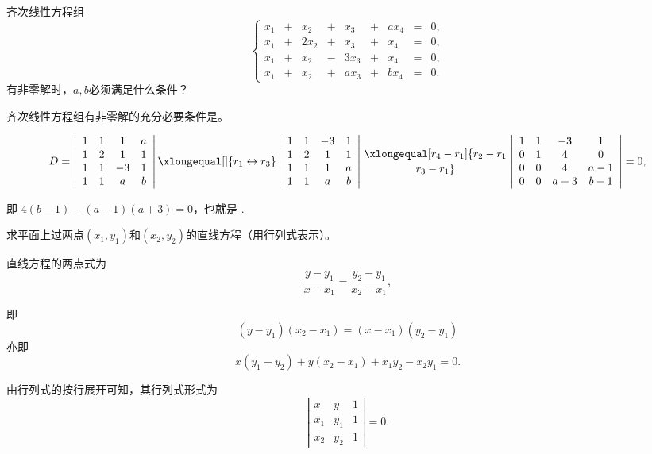 \begin{li}
  齐次线性方程组
  $$
  \left\{
    \begin{array}{rcrcrcrcrc}
      x_1&+& x_2&+& x_3&+&ax_4&=&0,\\[0.1cm]
      x_1&+&2x_2&+& x_3&+& x_4&=&0,\\[0.1cm]
      x_1&+& x_2&-&3x_3&+& x_4&=&0,\\[0.1cm]
      x_1&+& x_2&+&ax_3&+&bx_4&=&0.
    \end{array}
  \right.
  $$
  有非零解时，$a,b$必须满足什么条件？
\end{li}

\begin{zhu}
  齐次线性方程组有非零解的充分必要条件是。
\end{zhu}

\begin{jie}
$$
D = \left|
  \begin{array}{cccc}
    1&1&1&a\\
    1&2&1&1\\
    1&1&-3&1\\
    1&1&a&b\\
  \end{array}
\right|  \xlongequal[]{r_1\leftrightarrow r_3}
\left|
  \begin{array}{cccc}
    1&1&-3&1\\
    1&2&1&1\\
    1&1&1&a\\
    1&1&a&b\\
  \end{array}
\right|  \xlongequal[r_4-r_1]{r_2-r_1 \atop r_3-r_1}
\left|
  \begin{array}{cccc}
    1&1&-3&1\\
    0&1&4&0\\
    0&0&4&a-1\\
    0&0&a+3&b-1\\
  \end{array}
\right| = 0,
$$

即
$4(b-1)-(a-1)(a+3)=0$，也就是
.
\end{jie}





\begin{li}
  求平面上过两点$(x_1,y_1)$和$(x_2,y_2)$的直线方程（用行列式表示）。
\end{li}

\begin{jie}
直线方程的两点式为
$$
\frac{y-y_1}{x-x_1}=\frac{y_2-y_1}{x_2-x_1},
$$

即
$$
(y-y_1)(x_2-x_1)=(x-x_1)(y_2-y_1)
$$
亦即
$$
x(y_1-y_2)+y(x_2-x_1)+x_1y_2-x_2y_1=0.
$$

由行列式的按行展开可知，其行列式形式为
$$
\left|
  \begin{array}{ccc}
    x&y&1\\
    x_1&y_1&1\\
    x_2&y_2&1      
  \end{array}
\right|=0.
$$
\end{jie}



